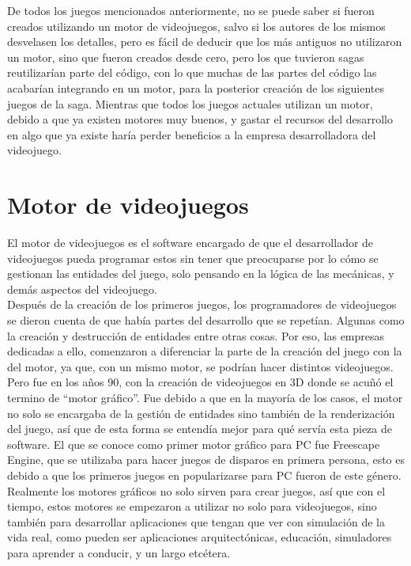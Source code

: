 De todos los juegos mencionados anteriormente, no se puede saber si fueron creados utilizando un motor de videojuegos, salvo si los autores de los mismos desvelasen los detalles, pero es fácil de deducir que los más antiguos no utilizaron un motor, sino que fueron creados desde cero, pero los que tuvieron sagas reutilizarían parte del código, con lo que muchas de las partes del código las acabarían integrando en un motor, para la posterior creación de los siguientes juegos de la saga. Mientras que todos los juegos actuales utilizan un motor, debido a que ya existen motores muy buenos, y gastar el recursos del desarrollo en algo que ya existe haría perder beneficios a la empresa desarrolladora del videojuego.

\section{Motor de videojuegos}
El motor de videojuegos es el software encargado de que el desarrollador de videojuegos pueda programar estos sin tener que preocuparse por lo cómo se gestionan las entidades del juego, solo pensando en la lógica de las mecánicas, y demás aspectos del videojuego. 
\\
Después de la creación de los primeros juegos, los programadores de videojuegos se dieron cuenta de que había partes del desarrollo que se repetían. Algunas como la creación y destrucción de entidades entre otras cosas. Por eso, las empresas dedicadas a ello, comenzaron a diferenciar la parte de la creación del juego con la del motor, ya que, con un mismo motor, se podrían hacer distintos videojuegos.
\\
Pero fue en los años 90, con la creación de videojuegos en 3D donde se acuñó el termino de ``motor gráfico''. Fue debido a que en la mayoría de los casos, el motor no solo se encargaba de la gestión de entidades sino también de la renderización del juego, así que de esta forma se entendía mejor para qué servía esta pieza de software. El que se conoce como primer motor gráfico para PC fue Freescape Engine, que se utilizaba para hacer juegos de disparos en primera persona, esto es debido a que los primeros juegos en popularizarse para PC fueron de este género.
\\
Realmente los motores gráficos no solo sirven para crear juegos, así que con el tiempo, estos motores se empezaron a utilizar no solo para videojuegos, sino también para desarrollar aplicaciones que tengan que ver con simulación de la vida real, como pueden ser aplicaciones arquitectónicas, educación, simuladores para aprender a conducir, y un largo etcétera.

